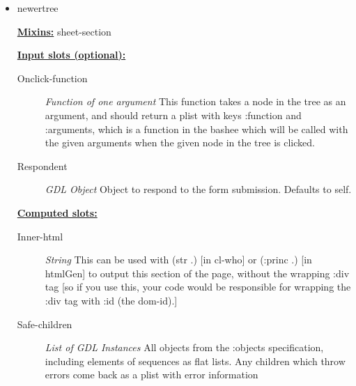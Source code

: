\documentclass [11pt]{book}
\begin{document}
\begin{itemize}

\item {}newertree


\textbf{
\underline{Mixins:}} sheet-section





\begin{description}

\end{description}








\textbf{
\underline{Input slots (optional):}}

\begin{description}

\item [Onclick-function]
\emph{Function of one argument} This function takes a node in the tree as an argument, and should return
a plist with keys :function and :arguments, which is a function in the bashee which will be called
with the given arguments when the given node in the tree is clicked.


\item [Respondent]
\emph{GDL Object} Object to respond to the form submission. Defaults to self.


\end{description}






\textbf{
\underline{Computed slots:}}

\begin{description}

\item [Inner-html]
\emph{String} This can be used with (str .) [in cl-who] or (:princ .) [in htmlGen]
to output this section of the page, without the wrapping :div tag [so if you use this,
your code would be responsible for wrapping the :div tag with :id (the dom-id).]


\item [Safe-children]
\emph{List of GDL Instances} All objects from the :objects specification, including elements of sequences
as flat lists. Any children which throw errors come back as a plist with error information



\end{description}
\end{itemize}
\end{document}
